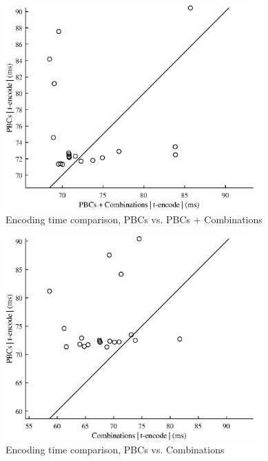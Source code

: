 {
\renewcommand{\figurename}{Plot}
\begin{figure}
    \centering
    \includegraphics[width = 0.85\textwidth]{Figures/opt_encode_2_1.eps}
    \caption{Encoding time comparison, PBCs vs. PBCs + Combinations}
    \label{opt_encode_2_1}
\end{figure}

\begin{figure}
    \centering
    \includegraphics[width = 0.85\textwidth]{Figures/opt_encode_3_1.eps}
    \caption{Encoding time comparison, PBCs vs. Combinations}
    \label{opt_encode_3_1}
\end{figure}

}
